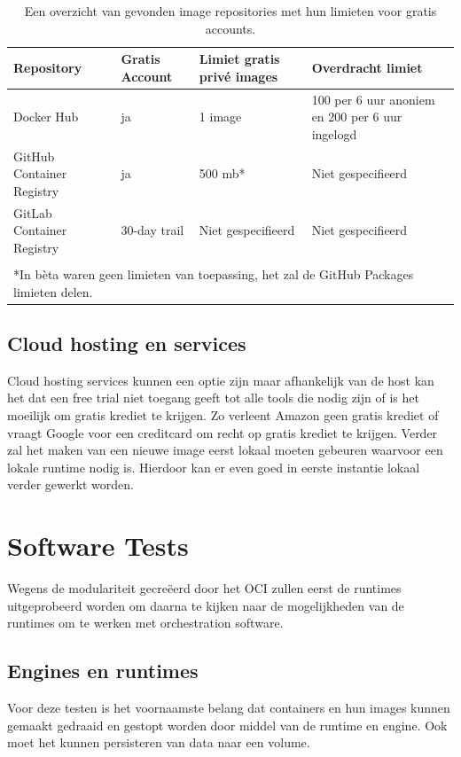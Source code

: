\begin{center}
    \begin{table}
        \begin{tabular}{ m{3.5cm} || m{2cm} | m{3.3cm} | m{4.5cm} }
            Repository & Gratis Account & Limiet gratis privé images & Overdracht limiet \\ 
            \hline
            Docker Hub & ja & 1 image & 100 per 6 uur anoniem en 200 per 6 uur ingelogd
             \\  
            \hline
            GitHub Container Registry & ja & 500 mb* & Niet gespecifieerd \\
            \hline 
            GitLab Container Registry & 30-day trail & Niet gespecifieerd & Niet gespecifieerd \\
            \multicolumn{4}{c}{ } \\
            \multicolumn{4}{l}{*In bèta waren geen limieten van toepassing, het zal de GitHub Packages limieten delen.} \\
        \end{tabular}
        \caption[Overzicht image repositories]{Een overzicht van gevonden image repositories met hun limieten voor gratis accounts.}
        \label{tab:repositories}
    \end{table}
\end{center}

\subsection{Cloud hosting en services}
Cloud hosting services kunnen een optie zijn maar afhankelijk van de host kan het dat een free trial niet toegang geeft tot alle tools die nodig zijn of is het moeilijk om gratis krediet te krijgen. Zo verleent Amazon geen gratis krediet of vraagt Google voor een creditcard om recht op gratis krediet te krijgen.  Verder zal het maken van een nieuwe image eerst lokaal moeten gebeuren waarvoor een lokale runtime nodig is. Hierdoor kan er even goed in eerste instantie lokaal verder gewerkt worden.

\section{Software Tests}
Wegens de modulariteit gecreëerd door het OCI zullen eerst de runtimes uitgeprobeerd worden om daarna te kijken naar de mogelijkheden van de runtimes om te werken met orchestration software.

\subsection{Engines en runtimes}
Voor deze testen is het voornaamste belang dat containers en hun images kunnen gemaakt gedraaid en gestopt worden door middel van de runtime en engine. Ook moet het kunnen persisteren van data naar een volume.

